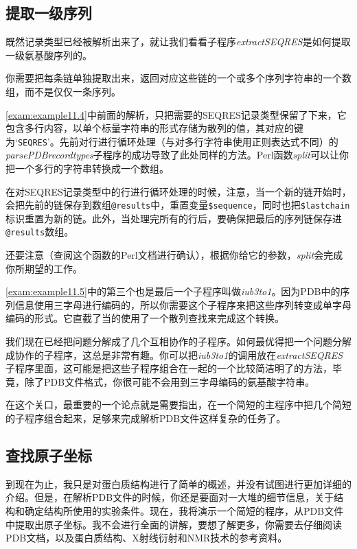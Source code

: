 \subsection{提取一级序列}
既然记录类型已经被解析出来了，就让我们看看子程序\textit{extractSEQRES}是如何提取一级氨基酸序列的。

你需要把每条链单独提取出来，返回对应这些链的一个或多个序列字符串的一个数组，而不是仅仅一条序列。

\autoref{exam:example11.4}中前面的解析，只把需要的SEQRES记录类型保留了下来，它包含多行内容，以单个标量字符串的形式存储为散列的值，其对应的键为`\verb|SEQRES|'。先前对行进行循环处理（与对多行字符串使用正则表达式不同）的\textit{parsePDBrecordtypes}子程序的成功导致了此处同样的方法。Perl函数\textit{split}可以让你把一个多行的字符串转换成一个数组。

在对SEQRES记录类型中的行进行循环处理的时候，注意，当一个新的链开始时，会把先前的链保存到数组\verb|@results|中，重置变量\verb|$sequence|，同时也把\verb|$lastchain|标识重置为新的链。此外，当处理完所有的行后，要确保把最后的序列链保存进\verb|@results|数组。

还要注意（查阅这个函数的Perl文档进行确认），根据你给它的参数，\textit{split}会完成你所期望的工作。

\autoref{exam:example11.5}中的第三个也是最后一个子程序叫做\textit{iub3to1}。因为PDB中的序列信息使用三字母进行编码的，所以你需要这个子程序来把这些序列转变成单字母编码的形式。它直截了当的使用了一个散列查找来完成这个转换。

我们现在已经把问题分解成了几个互相协作的子程序。如何最优得把一个问题分解成协作的子程序，这总是非常有趣。你可以把\textit{iub3to1}的调用放在\textit{extractSEQRES}子程序里面，这可能是把这些子程序组合在一起的一个比较简洁明了的方法，毕竟，除了PDB文件格式，你很可能不会用到三字母编码的氨基酸字符串。

在这个关口，最重要的一个论点就是需要指出，在一个简短的主程序中把几个简短的子程序组合起来，足够来完成解析PDB文件这样复杂的任务了。

\subsection{查找原子坐标}
到现在为止，我只是对蛋白质结构进行了简单的概述，并没有试图进行更加详细的介绍。但是，在解析PDB文件的时候，你还是要面对一大堆的细节信息，关于结构和确定结构所使用的实验条件。现在，我将演示一个简短的程序，从PDB文件中提取出原子坐标。我不会进行全面的讲解，要想了解更多，你需要去仔细阅读PDB文档，以及蛋白质结构、X射线衍射和NMR技术的参考资料。

